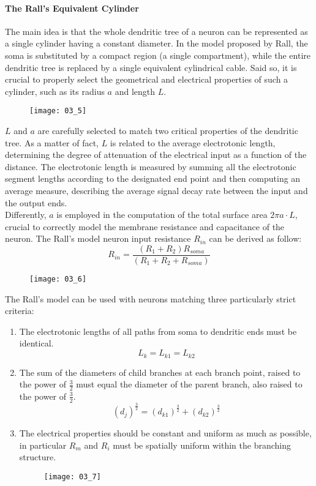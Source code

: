 \paragraph{The Rall's Equivalent Cylinder}
The main idea is that the whole dendritic tree of a neuron can be represented as a single cylinder
having a constant diameter. In the model proposed by Rall, the soma is substituted by
a compact region (a single compartment), while the entire dendritic tree is replaced by
a single equivalent cylindrical cable. Said so, it is crucial to properly select the
geometrical and electrical properties of such a cylinder, such as its radius \(a\) and
length \(L\).
\begin{figure}[H]
    \texttt{[image: 03\_5]}
    \centering
\end{figure}
\(L\) and \(a\) are carefully selected to match two critical properties of the dendritic
tree. As a matter of fact, \(L\) is related to the average electrotonic length,
determining the degree of attenuation of the electrical input as a function of the distance.
The electrotonic length is measured by summing all the electrotonic segment lengths according
to the designated end point and then computing an average measure, describing the average
signal decay rate between the input and the output ends.\\
Differently, \(a\) is employed in the computation of the total surface area \(2\pi{a}\cdot{L}\),
crucial to correctly model the membrane resistance and capacitance of the neuron. The Rall's
model neuron input resistance \(R_{in}\) can be derived as follow:
\begin{equation*}
    R_{in}=\frac{(R_{1}+R_{2})R_{soma}}{(R_{1}+R_{2}+R_{soma})}
\end{equation*}
\begin{figure}[H]
    \texttt{[image: 03\_6]}
    \centering
\end{figure}
The Rall's model can be used with neurons matching three particularly strict criteria:
\begin{enumerate}
    \item The electrotonic lengths of all paths from soma to dendritic ends must be identical.
          \begin{equation*}
              L_{k}=L_{k1}=L_{k2}
          \end{equation*}
    \item The sum of the diameters of child branches at each branch point, raised to the power
          of \(\frac{3}{2}\) must equal the diameter of the parent branch, also raised to the power
          of \(\frac{3}{2}\).
          \begin{equation*}
              (d_{j})^{\frac{3}{2}}=(d_{k1})^{\frac{3}{2}}+(d_{k2})^{\frac{3}{2}}
          \end{equation*}
    \item The electrical properties should be constant and uniform as much as possible, in
          particular \(R_{m}\) and \(R_{i}\) must be spatially uniform within the branching structure.
          \begin{figure}[H]
              \texttt{[image: 03\_7]}
              \centering
          \end{figure}
\end{enumerate}
